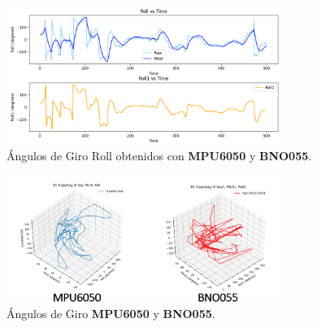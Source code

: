         \begin{figure}[H]
            \centering
            \includegraphics[width=0.8\textwidth]{Imagenes/Metodologia/Angulos_Giro_roll_Mpu6050_BNO055.png}
            \caption{Ángulos de Giro Roll obtenidos con \textbf{MPU6050} y \textbf{BNO055}.}
            \label{fig:roll}
        \end{figure}

        \begin{figure}[H]
            \centering
            \includegraphics[width=0.8\textwidth]{Imagenes/Metodologia/Angulos_Giro_Mpu6050_BNO055.png}
            \caption{Ángulos de Giro \textbf{MPU6050} y \textbf{BNO055}.}
            \label{fig:3d_trajectory}
        \end{figure}




